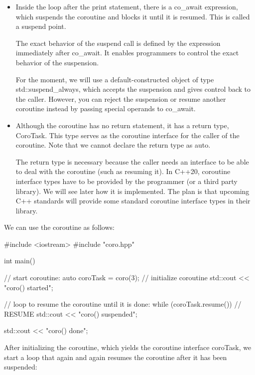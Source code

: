 \begin{itemize}
\item 
Inside the loop after the print statement, there is a co\_await expression, which suspends the coroutine and blocks it until it is resumed. This is called a suspend point.

The exact behavior of the suspend call is defined by the expression immediately after co\_await. It enables programmers to control the exact behavior of the suspension.

For the moment, we will use a default-constructed object of type std::suspend\_always, which accepts the suspension and gives control back to the caller. However, you can reject the suspension or resume another coroutine instead by passing special operands to co\_await.

\item 
Although the coroutine has no return statement, it has a return type, CoroTask. This type serves as the coroutine interface for the caller of the coroutine. Note that we cannot declare the return type as auto.

The return type is necessary because the caller needs an interface to be able to deal with the coroutine (such as resuming it). In C++20, coroutine interface types have to be provided by the programmer (or a third party library). We will see later how it is implemented. The plan is that upcoming C++ standards will provide some standard coroutine interface types in their library.
\end{itemize}


We can use the coroutine as follows:


\begin{cpp}
#include <iostream>
#include "coro.hpp"

int main()
{
	// start coroutine:
	auto coroTask = coro(3); // initialize coroutine
	std::cout << "coro() started\n";
	
	// loop to resume the coroutine until it is done:
	while (coroTask.resume()) { // RESUME
		std::cout << "coro() suspended\n";
	}
	
	std::cout << "coro() done\n";
}
\end{cpp}

After initializing the coroutine, which yields the coroutine interface coroTask, we start a loop that again and again resumes the coroutine after it has been suspended:

